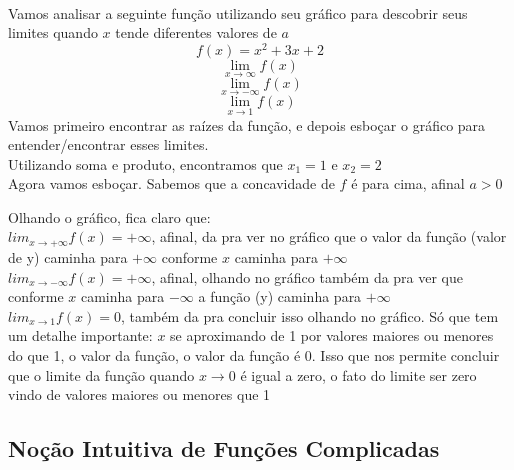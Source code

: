 \documentclass{article}
\begin{document}
\\[5pt]
Vamos analisar a seguinte função utilizando seu gráfico para descobrir seus limites quando $x$ tende diferentes valores de $a$
\[
f(x) = x^2 + 3x + 2
\]
\[
\lim_{x \to \infty} f(x) 
\]
\[
\lim_{x \to -\infty} f(x) 
\]
\[
\lim_{x \to 1} f(x) 
\]
Vamos primeiro encontrar as raízes da função, e depois esboçar o gráfico para entender/encontrar esses limites.
\\[2pt]
Utilizando soma e produto, encontramos que $x_1=1$ e $x_2=2$
\\[2pt]
Agora vamos esboçar. Sabemos que a concavidade de $f$ é para cima, afinal $a>0$
\begin{center}
\end{center}
Olhando o gráfico, fica claro que:
\\[2pt]
$lim_{x \to +\infty} f(x)=+\infty$, afinal, da pra ver no gráfico que o valor da função (valor de y) caminha para $+\infty$ conforme $x$ caminha para $+\infty$
\\[2pt]
$lim_{x \to -\infty} f(x)=+\infty$, afinal, olhando no gráfico também da pra ver que conforme $x$ caminha para $-\infty$ a função (y) caminha para $+\infty$
\\[2pt]
$lim_{x \to 1} f(x)=0$, também da pra concluir isso olhando no gráfico. Só que tem um detalhe importante: $x$ se aproximando de 1 por valores maiores ou menores do que 1, o valor da função, o valor da função é 0. Isso que nos permite concluir que o limite da função quando $x \to 0$ é igual a zero, o fato do limite ser zero vindo de valores maiores ou menores que 1

\subsection{Noção Intuitiva de Funções Complicadas}
\end{document}
